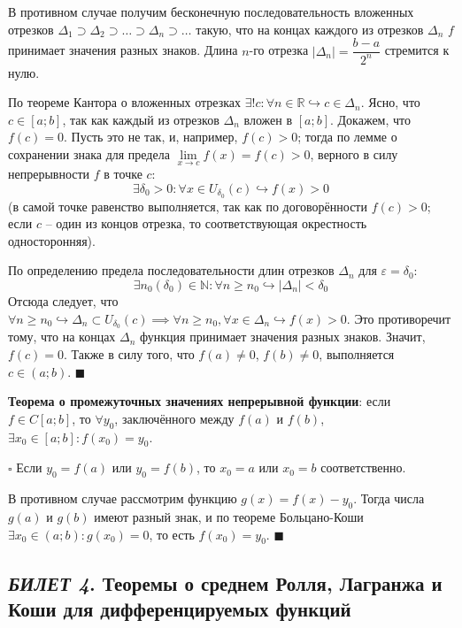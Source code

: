 \documentclass[12pt, a4paper, reqno]{article}
\begin{document}
    В противном случае получим бесконечную последовательность вложенных отрезков $\Delta_1 \supset
    \Delta_2 \supset \ldots \supset \Delta_n \supset \ldots$ такую, что на концах каждого из отрезков
    $\Delta_n$ $f$ принимает значения разных знаков. Длина $n$-го отрезка $|\Delta_n| = \dfrac{b - a}{2^n}$
    стремится к нулю.

    По теореме Кантора о вложенных отрезках $\exists!c: \forall n\in\mathbb{R}\hookrightarrow
    c\in\Delta_n$. Ясно, что $c\in[a; b]$, так как каждый из отрезков $\Delta_n$ вложен в
    $[a; b]$. Докажем, что $f(c) = 0$. Пусть это не так, и, например, $f(c) > 0$; тогда по лемме о
    сохранении знака для предела $\lim\limits_{x\to c} f(x) = f(c) > 0$, верного в силу
    непрерывности $f$ в точке $c$:
    \begin{equation*}
        \exists\delta_0 > 0: \forall x\in U_{\delta_0}(c)\hookrightarrow f(x) > 0
    \end{equation*}
    (в самой точке равенство выполняется, так как по договорённости $f(c) > 0$; если $c$ -- один из
    концов отрезка, то соответствующая окрестность односторонняя).

    По определению предела последовательности длин отрезков $\Delta_n$ для $\varepsilon = \delta_0$:
    \begin{equation*}
        \exists n_0(\delta_0)\in\mathbb{N}: \forall n\geq n_0\hookrightarrow |\Delta_n| < \delta_0
    \end{equation*}
    Отсюда следует, что $\forall n \geq n_0\hookrightarrow \Delta_n \subset U_{\delta_0}(c) \implies
    \forall n \geq n_0, \forall x \in \Delta_n \hookrightarrow f(x) > 0$. Это противоречит тому,
    что на концах $\Delta_n$ функция принимает значения разных знаков. Значит, $f(c) = 0$. Также в
    силу того, что $f(a) \neq 0$, $f(b) \neq 0$, выполняется $c\in(a; b)$. $\blacksquare$

    \textbf{Теорема о промежуточных значениях непрерывной функции}: если $f \in C[a; b]$, то
    $\forall y_0$, заключённого между $f(a)$ и $f(b)$, $\exists x_0\in[a; b]: f(x_0) = y_0$.

    $\square$ Если $y_0 = f(a)$ или $y_0 = f(b)$, то $x_0 = a$ или $x_0 = b$ соответственно.

    В противном случае рассмотрим функцию $g(x) = f(x) - y_0$. Тогда числа $g(a)$ и $g(b)$ имеют
    разный знак, и по теореме Больцано-Коши $\exists x_0\in(a; b): g(x_0) = 0$, то есть $f(x_0) =
    y_0$. $\blacksquare$

\newpage
\subsection{\textit{БИЛЕТ 4}. Теоремы о среднем Ролля, Лагранжа и Коши для дифференцируемых функций}
\end{document}
